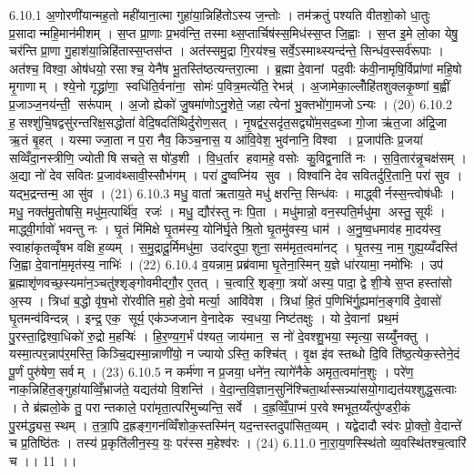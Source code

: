 6.10.1
अ॒णोरणी॑यान्मह॒तो मही॑याना॒त्मा गुहा॑या॒न्निहि॑तोऽस्य ज॒न्तोः । तम॑क्रतुं पश्यति वीतशो॒को धा॒तुः प्र॒सादान्महि॒मान॑मीशम् । स॒प्त प्रा॒णाः प्र॒भव॑न्ति॒ तस्माथ्स॒प्तार्चिष॑स्स॒मिध॑स्स॒प्त जि॒ह्वाः । स॒प्त इ॒मे लो॒का येषु॒ चर॑न्ति प्रा॒णा गु॒हाश॑या॒न्निहि॑तास्स॒प्तस॑प्त । अत॑स्समु॒द्रा गि॒रय॑श्च॒ सर्वे॒ऽस्माथ्स्यन्द॑न्ते॒ सिन्ध॑व॒स्सर्व॑रूपाः । अत॑श्च॒ विश्वा॒ ओष॑धयो॒ रसाश्च॒ येनै॑ष भू॒तस्ति॑ष्ठत्यन्तरा॒त्मा । ब्र॒ह्मा दे॒वानां पद॒वीः क॑वी॒नामृषि॒र्विप्रा॑णां महि॒षो मृ॒गाणाम् । श्ये॒नो गृद्ध्रा॑णा॒ स्वधि॑ति॒र्वना॑ना॒ सोमः॑ प॒वित्र॒मत्ये॑ति॒ रेभन्न्॑ । अ॒जामेका॒ल्लोँहि॑तशुक्लकृ॒ष्णां ब॒ह्वीं प्र॒जाञ्ज॒नय॑न्ती॒ सरू॑पाम् । अ॒जो ह्येको॑ जु॒षमा॑णोऽनु॒शेते॒ जहात्येनां भु॒क्तभो॑गा॒मजोऽन्यः । (20)
6.10.2
ह॒सश्शु॑चि॒षद्वसु॑रन्तरिक्ष॒सद्धोता॑ वेदि॒षदति॑थिर्दुरोण॒सत् । नृ॒षद्व॑र॒सदृ॑त॒सद्व्यो॑म॒सद॒ब्जा गो॒जा ऋ॑त॒जा अ॑द्रि॒जा ऋ॒तं बृ॒हत् । यस्माज्जा॒ता न प॒रा नैव॒ किञ्च॒नास॒ य आ॑वि॒वेश॒ भुव॑नानि॒ विश्वा । प्र॒जाप॑तिः प्र॒जया॑ सव्विँदा॒नस्त्रीणि॒ ज्योतीषि सचते॒ स षो॑ड॒शी । वि॒ध॒र्तार हवामहे॒ वसोः कु॒विद्व॒नाति॑ नः । स॒वि॒तार॑न्नृ॒चक्ष॑सम् । अ॒द्या नो॑ देव सवितः प्र॒जाव॑थ्सावी॒स्सौभ॑गम् । परा॑ दु॒ष्वप्नि॑य सुव । विश्वा॑नि देव सवितर्दुरि॒तानि॒ परा॑ सुव । यद्भ॒द्रन्तन्म॒ आ सु॑व । (21)
6.10.3
मधु॒ वाता॑ ऋताय॒ते मधु॑ क्षरन्ति॒ सिन्ध॑वः । माद्ध्वीर्नस्स॒न्त्वोष॑धीः । मधु॒ नक्त॑मु॒तोषसि॒ मधु॑म॒त्पार्थि॑व॒ रजः॑ । मधु॒ द्यौर॑स्तु नः पि॒ता । मधु॑मान्नो॒ वन॒स्पति॒र्मधु॑मा अस्तु॒ सूर्यः॑ । माद्ध्वी॒र्गावो॑ भवन्तु नः । घृ॒तं मि॑मिक्षे घृ॒तम॑स्य॒ योनि॑र्घृ॒ते श्रि॒तो घृ॒तमु॑वस्य॒ धाम॑ । अ॒नु॒ष्व॒धमाव॑ह मा॒दय॑स्व॒ स्वाहा॑कृतव्वृँषभ वक्षि ह॒व्यम् । स॒मु॒द्रादू॒र्मिमधु॑मा॒ उदा॑रदुपा॒शुना॒ सम॑मृत॒त्वमा॑नट् । घृ॒तस्य॒ नाम॒ गुह्य॒य्यँदस्ति॑ जि॒ह्वा दे॒वाना॑म॒मृत॑स्य॒ नाभिः॑ । (22)
6.10.4
व॒यन्नाम॒ प्रब्र॑वामा घृ॒तेना॒स्मिन् य॒ज्ञे धा॑रयामा॒ नमो॑भिः । उप॑ ब्र॒ह्माशृ॑णवच्छ॒स्यमा॑न॒ञ्चतु॑श्शृङ्गोवमीद्गौ॒र ए॒तत् । च॒त्वारि॒ शृङ्गा॒ त्रयो॑ अस्य॒ पादा॒ द्वे शी॒ऱ्षे स॒प्त हस्ता॑सो अ॒स्य । त्रिधा॑ ब॒द्धो वृ॑ष॒भो रो॑रवीति म॒हो दे॒वो मर्त्या॒ आवि॑वेश । त्रिधा॑ हि॒तं प॒णिभि॑र्गु॒ह्यमा॑न॒ङ्गवि॑ दे॒वासो॑ घृ॒तमन्व॑विन्दन्न् । इन्द्र॒ एक॒ सूर्य॒ एक॑ञ्जजान वे॒नादेक॑ स्व॒धया॒ निष्ट॑तक्षुः । यो दे॒वानां प्रथ॒मं पु॒रस्ता॒द्विश्वा॒धिको॑ रु॒द्रो म॒हऱ्षिः॑ । हि॒र॒ण्य॒ग॒र्भं प॑श्यत॒ जाय॑मान॒ स नो॑ दे॒वश्शु॒भया॒ स्मृत्या॒ सय्युँ॑नक्तु । यस्मा॒त्पर॒न्नाप॑र॒मस्ति॒ किञ्चि॒द्यस्मा॒न्नाणी॑यो॒ न ज्यायोऽस्ति॒ कश्चि॑त् । वृ॒क्ष इ॑व स्तब्धो दि॒वि ति॑ष्ठ॒त्येक॒स्तेने॒दं पू॒र्णं पुरु॑षेण॒ सर्वम् । (23)
6.10.5
न कर्म॑णा न प्र॒जया॒ धने॑न॒ त्यागे॑नैके अमृत॒त्वमा॑न॒शुः । परे॑ण॒ नाक॒न्निहि॑त॒ङ्गुहा॑याव्विँ॒भ्राज॑ते॒ यद्यत॑यो वि॒शन्ति॑ । वे॒दा॒न्त॒वि॒ज्ञान॒सुनि॑श्चिता॒र्थास्सन्न्या॑सयो॒गाद्यत॑यश्शुद्ध॒सत्वाः । ते ब्र॑ह्मलो॒के तु॒ परान्तकाले॒ परा॑मृता॒त्परि॑मुच्यन्ति॒ सर्वे । द॒ह्र॒व्विँ॒पा॒प्मं प॒रवेश्मभूत॒य्यँत्पु॑ण्डरी॒कं पु॒रम॑द्ध्यस॒स्थम् । त॒त्रा॒पि द॒ह्रङ्ग॒गन॑व्विँशोक॒स्तस्मि॑न् यद॒न्तस्तदुपा॑सित॒व्यम् । यद्वेदादौ स्व॑रः प्रो॒क्तो॒ वे॒दान्ते॑ च प्र॒तिष्ठि॑तः । तस्य॑ प्र॒कृति॑लीन॒स्य॒ यः॒ पर॑स्स म॒हेश्व॑रः । (24)
6.11.0
ना॒रा॒य॒णस्स्थि॑तो व्य॒वस्थि॑तश्च॒त्वारि॑ च ।। 11 ।।
\anuvakamend

